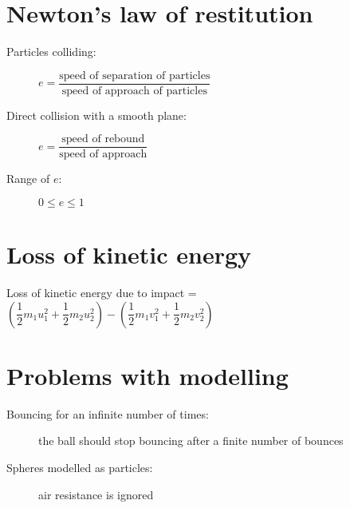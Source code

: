 \section{Newton's law of restitution}
\begin{description}
    \item[Particles colliding:] $e=\dfrac{\text{speed of separation of particles}}{\text{speed of approach of particles}}$
    \item[Direct collision with a smooth plane:] $e=\dfrac{\text{speed of rebound}}{\text{speed of approach}}$
    \item[Range of $e$:] $0 \leq e \leq 1$
\end{description}

\section{Loss of kinetic energy}
Loss of kinetic energy due to impact = $(\dfrac{1}{2}m_1u_1^2+\dfrac{1}{2}m_2u_2^2)-(\dfrac{1}{2}m_1v_1^2+\dfrac{1}{2}m_2v_2^2)$

\section{Problems with modelling} %
\begin{description}
    \item[Bouncing for an infinite number of times:] the ball should stop bouncing after a finite number of bounces
    \item[Spheres modelled as particles:] air resistance is ignored
\end{description}